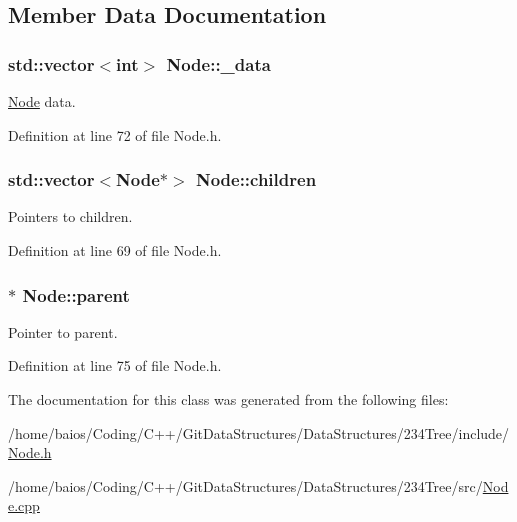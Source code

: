\subsection{Member Data Documentation}
\hypertarget{class_node_aebcdeef2d940bb25316fd0eac5d51ed2}{
\subsubsection[{\-\_\-data}]{\setlength{\rightskip}{0pt plus 5cm}std\-::vector$<$int$>$ Node\-::\-\_\-data}}\label{class_node_aebcdeef2d940bb25316fd0eac5d51ed2}


\hyperlink{class_node}{Node} data. 



Definition at line 72 of file Node.\-h.

\hypertarget{class_node_a49baf1d613dc14f1e1e4aad883dde6fe}{
\subsubsection[{children}]{\setlength{\rightskip}{0pt plus 5cm}std\-::vector$<${\bf Node}$\ast$$>$ Node\-::children}}\label{class_node_a49baf1d613dc14f1e1e4aad883dde6fe}


Pointers to children. 



Definition at line 69 of file Node.\-h.

\hypertarget{class_node_ad8184598cdea70e4bbdfd76f2b0f9e85}{
\subsubsection[{parent}]{$\ast$ Node\-::parent}}\label{class_node_ad8184598cdea70e4bbdfd76f2b0f9e85}


Pointer to parent. 



Definition at line 75 of file Node.\-h.



The documentation for this class was generated from the following files\-:\begin{DoxyCompactItemize}
\item 
/home/baios/\-Coding/\-C++/\-Git\-Data\-Structures/\-Data\-Structures/234\-Tree/include/\hyperlink{_node_8h}{Node.\-h}\item 
/home/baios/\-Coding/\-C++/\-Git\-Data\-Structures/\-Data\-Structures/234\-Tree/src/\hyperlink{_node_8cpp}{Node.\-cpp}\end{DoxyCompactItemize}
